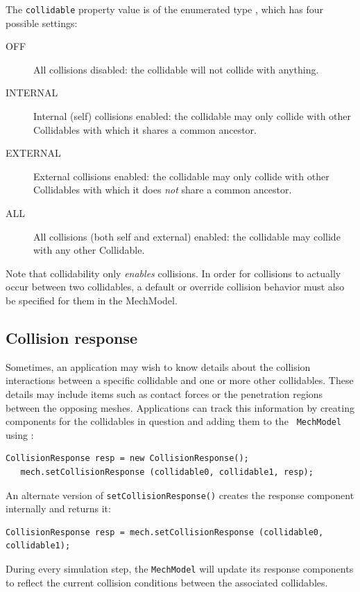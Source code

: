 The {\tt collidable} property value is of the enumerated type
, which
has four possible settings:

\begin{description}

\item[OFF]\mbox{}

All collisions disabled: the collidable will not collide with
anything.

\item[INTERNAL]\mbox{}

Internal (self) collisions enabled: the collidable may only collide
with other Collidables with which it shares a common ancestor.

\item[EXTERNAL]\mbox{}

External collisions enabled: the collidable may only collide with
other Collidables with which it does {\it not} share a common
ancestor.

\item[ALL]\mbox{}

All collisions (both self and external) enabled: the collidable may
collide with any other Collidable.

\end{description}

Note that collidability only {\it enables} collisions.  In order for
collisions to actually occur between two collidables, a default or
override collision behavior must also be specified for them in the
MechModel.

\subsection{Collision response}

Sometimes, an application may wish to know details about the collision
interactions between a specific collidable and one or more other
collidables.  These details may include items such as contact
forces or the penetration regions between the opposing meshes.
Applications can track this information by
creating 
components for the collidables in question and adding them to the {\tt
MechModel} using 
:
%
\begin{lstlisting}[]
   CollisionResponse resp = new CollisionResponse();
   mech.setCollisionResponse (collidable0, collidable1, resp);
\end{lstlisting}
%
An alternate version of {\tt setCollisionResponse()} creates the
response component internally and returns it:
%
\begin{lstlisting}[]
   CollisionResponse resp = mech.setCollisionResponse (collidable0, collidable1);
\end{lstlisting}
%
During every simulation step, the {\tt MechModel} will update its
response components to reflect the current collision conditions
between the associated collidables.

